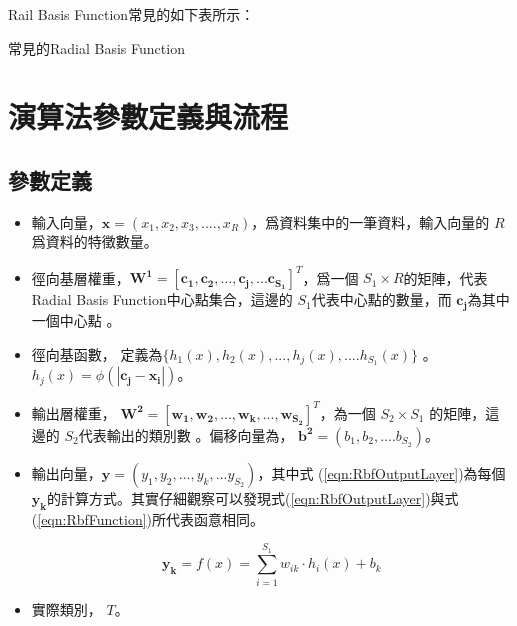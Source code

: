 Rail Basis Function常見的如下表所示：
\\

\begin{table}[h!]
	\centering
	\label{tab:rbf_table}
	
	\caption{常見的Radial Basis Function}
\end{table}






\section{演算法參數定義與流程}




\subsection{參數定義}
\begin{itemize}
	\item
	      輸入向量，\(\mathbf{x} = (x_1,x_2,x_3,....,x_R)\)，爲資料集中的一筆資料，輸入向量的 \(R\) 爲資料的特徵數量。
	\item
	      徑向基層權重，\(\mathbf{W^1} = [\mathbf{c_1,c_2,...,c_j,...c_{S_1}}]^T\)，爲一個 \(S_1 \times R \)的矩陣，代表Radial Basis Function中心點集合，這邊的 \(S_1\)代表中心點的數量，而 \(\mathbf{c_j}\)為其中一個中心點 。
	\item
	      徑向基函數， 定義為\(\{h_1(x), h_2(x),...,h_j(x),....h_{S_1}(x) \}\)  。
	      $h_j(x)=\phi(\mathbf{|c_j-x_i|})$。


	\item
	      輸出層權重， \(\mathbf{W^2}= [\mathbf{w_1,w_2,...,w_k,...,w_{S_2}}]^T\)，為一個 \(S_2 \times S_1\) 的矩陣，這邊的 \(S_2\)代表輸出的類別數 。偏移向量為， \(\mathbf{b^2}=(b_1,b_2,....b_{S_2})\)。
	\item
	      輸出向量，\(\mathbf{y}= (y_1,y_2,...,y_k,...y_{S_2})\)，其中式 (\ref{eqn:RbfOutputLayer})為每個 \(\mathbf{y_k}\)的計算方式。其實仔細觀察可以發現式(\ref{eqn:RbfOutputLayer})與式(\ref{eqn:RbfFunction})所代表函意相同。

	      \begin{equation}
		      \label{eqn:RbfOutputLayer}
		      \mathbf{y_k}= f(x) = \sum_{i=1}^{S_1}w_{ik}\cdot h_i(x)+b_k
	      \end{equation}
	\item
	      實際類別， \(T\)。
\end{itemize}

